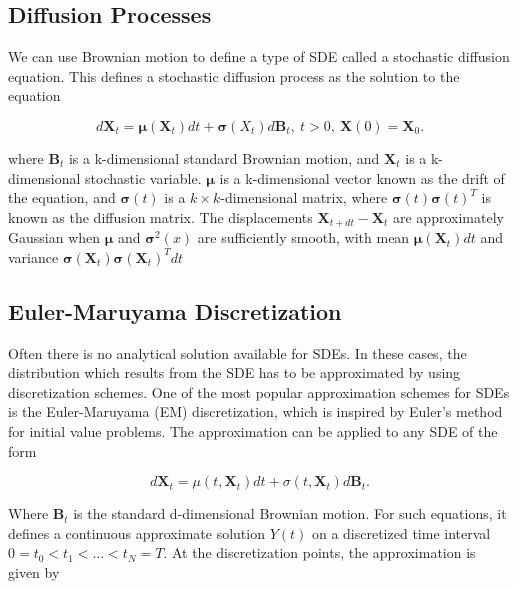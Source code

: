 \subsection{Diffusion Processes}
\label{sec: diffusion processes}
We can use Brownian motion to define a type of SDE called a stochastic diffusion equation. This defines a stochastic diffusion process as the solution to the equation

\begin{equation}
    d{\textbf{X}}_t = {\pmb{\mu}} ({\textbf{X}}_t )dt + \pmb{\sigma}({X}_t ) d\textbf{B}_t, \   t > 0 , \ \textbf{X}(0) = \textbf{X}_0.
\end{equation}

where $\textbf{B}_t$ is a k-dimensional standard Brownian motion, and $\textbf{X}_t$ is a k-dimensional stochastic variable. $\pmb{\mu}$ is a k-dimensional vector known as the drift of the equation, and $\pmb{\sigma}(t)$ is a $k\times k$-dimensional matrix, where $\pmb{\sigma}(t)\pmb{\sigma}(t)^T$ is known as the diffusion matrix. The displacements $\textbf{X}_{t+dt} - \textbf{X}_t$ are approximately Gaussian when $\pmb{\mu}$ and $\pmb{\sigma}^2(x)$ are sufficiently smooth, with mean $\pmb{\mu}(\textbf{X}_t)dt$ and variance $\pmb{\sigma}(\textbf{X}_t)\pmb{\sigma}(\textbf{X}_t)^Tdt$ \parencite{bhattacharya_continuous_2023}




\subsection{Euler-Maruyama  Discretization}
\label{subsec: Euler-Maruyama}
Often there is no analytical solution available for SDEs. In these cases, the distribution which results from the SDE has to be approximated by using discretization schemes.  One of the most popular approximation schemes for SDEs is the Euler-Maruyama (EM) discretization, which is inspired by Euler's method for initial value problems. The approximation can be applied to any SDE of the form

\begin{equation}
    d\textbf{X}_t = \mu(t, \textbf{X}_t)dt + \sigma(t, \textbf{X}_t)d\textbf{B}_t.
\end{equation}

Where $\textbf{B}_t$ is the standard d-dimensional Brownian motion. For such equations, it defines a continuous approximate solution $Y(t)$ on a discretized time interval $0=t_0 < t_1 < \dots < t_N = T$. At the discretization points, the approximation is given by

